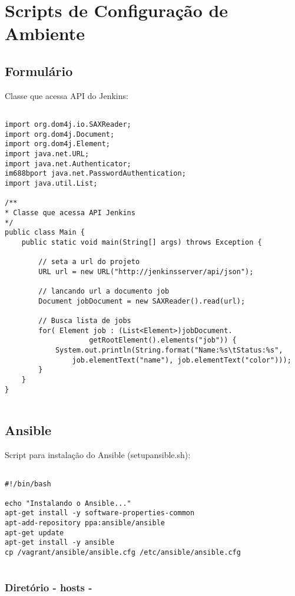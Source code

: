 \appendix

\chapter{Scripts de Configuração de Ambiente}

\section{Formulário}

\noindent
Classe que acessa API do Jenkins:

\scriptsize
\begin{lstlisting}

import org.dom4j.io.SAXReader;
import org.dom4j.Document;
import org.dom4j.Element;
import java.net.URL;
import java.net.Authenticator;
im688bport java.net.PasswordAuthentication;
import java.util.List;
	
/**
* Classe que acessa API Jenkins
*/
public class Main {
	public static void main(String[] args) throws Exception {
	
		// seta a url do projeto 
		URL url = new URL("http://jenkinsserver/api/json");
	
		// lancando url a documento job
		Document jobDocument = new SAXReader().read(url);
	
		// Busca lista de jobs
		for( Element job : (List<Element>)jobDocument.
					getRootElement().elements("job")) {
			System.out.println(String.format("Name:%s\tStatus:%s",
				job.elementText("name"), job.elementText("color")));
		}
	}
}


\end{lstlisting}


\section{Ansible}


\noindent
Script para instalação do Ansible (setupansible.sh):


\begin{lstlisting}

#!/bin/bash

echo "Instalando o Ansible..."
apt-get install -y software-properties-common
apt-add-repository ppa:ansible/ansible
apt-get update
apt-get install -y ansible
cp /vagrant/ansible/ansible.cfg /etc/ansible/ansible.cfg


\end{lstlisting}

\subsection{Diretório - hosts -}

